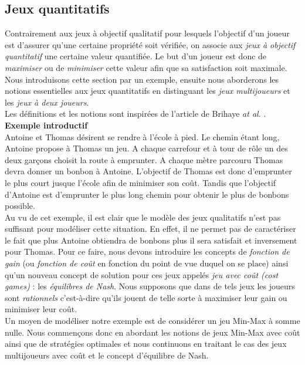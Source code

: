 
\subsection{Jeux quantitatifs }

Contrairement aux jeux à objectif qualitatif pour lesquels l'objectif d'un joueur est d'assurer qu'une certaine propriété soit vérifiée, on associe aux \textit{jeux à objectif quantitatif} une certaine valeur quantifiée. Le but d'un joueur est donc de \textit{maximiser} ou de \textit{minimiser} cette valeur afin que sa satisfaction soit maximale.\\

Nous introduisons cette section par un exemple, ensuite nous aborderons les notions essentielles aux jeux quantitatifs en distinguant les \textit{jeux multijoueurs} et les \textit{jeux à deux joueurs}.\\
Les définitions et les notions sont inspirées de l'article de Brihaye \emph{at al.} \cite{DBLP:conf/lfcs/BrihayePS13}.\\

\noindent\textbf {Exemple introductif} \\
\indent Antoine et Thomas désirent se rendre à l'école à pied. Le chemin étant long, Antoine propose à Thomas un jeu. A chaque carrefour et à tour de rôle un des deux garçons choisit la route à emprunter. A chaque mètre parcouru Thomas devra donner un bonbon à Antoine. L'objectif de Thomas est donc d'emprunter le plus court jusque l'école afin de minimiser son coût. Tandis que l'objectif d'Antoine est d'emprunter le plus long chemin pour obtenir le plus de bonbons possible.\\

Au vu de cet exemple, il est clair que le modèle des jeux qualitatifs n'est pas suffisant pour modéliser cette situation. En effet, il ne permet pas de caractériser le fait que plus Antoine obtiendra de bonbons plus il sera satisfait et inversement pour Thomas. Pour ce faire, nous devons introduire les concepts de \textit{fonction de gain} (ou \textit{fonction de coût} en fonction du point de vue duquel on se place) ainsi qu'un nouveau concept de solution pour ces jeux appelés \textit{jeu avec coût (cost games)} : les \textit{équilibres de Nash}. Nous supposons que dans de tels jeux les joueurs sont \textit{rationnels} c'est-à-dire qu'ils jouent de telle sorte à maximiser leur gain ou minimiser leur coût.\\

Un moyen de modéliser notre exemple est de considérer un jeu Min-Max à somme nulle. Nous commençons donc en abordant les notions de jeux Min-Max avec coût ainsi que de stratégies optimales et nous continuons en traitant le cas des jeux multijoueurs avec coût et le concept d'équilibre de Nash.\\






